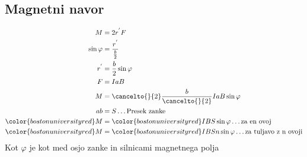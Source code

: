 {\color{indiagreen}\subsection{Magnetni navor}}
\begin{align*}
	M &= 2 r^{'}F\\
	\sin\varphi &= \frac{r^{'}}{\frac{b}{2}}\\
	r^{'} &= \frac{b}{2} \sin\varphi\\
	F &= IaB\\
	M &= \cancelto{}{2} \frac{b}{\cancelto{}{2}} IaB \sin\varphi\\
	ab &= S \dots \text{Presek zanke}\\
	{\color{bostonuniversityred}M} &= {\color{bostonuniversityred}IBS \sin\varphi} \dots \text{za en ovoj}\\
	{\color{bostonuniversityred}M} &= {\color{bostonuniversityred}IBSn \sin\varphi} \dots \text{za tuljavo z n ovoji}\\
\end{align*}
Kot $\varphi$ je kot med osjo zanke in silnicami magnetnega polja\\
